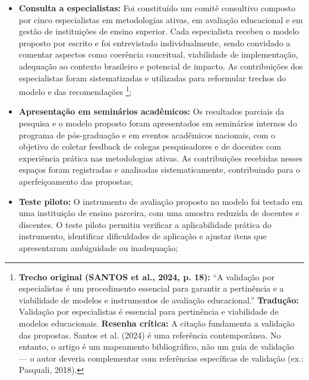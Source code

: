 \begin{itemize}
    \item \textbf{Consulta a especialistas:} Foi constituído um comitê consultivo composto por cinco especialistas em metodologias ativas, em avaliação educacional e em gestão de instituições de ensino superior. Cada especialista recebeu o modelo proposto por escrito e foi entrevistado individualmente, sendo convidado a comentar aspectos como coerência conceitual, viabilidade de implementação, adequação ao contexto brasileiro e potencial de impacto. As contribuições dos especialistas foram sistematizadas e utilizadas para reformular trechos do modelo e das recomendações \cite{SANTOS2024}\footnote{\textbf{Trecho original (SANTOS et al., 2024, p. 18):} ``A validação por especialistas é um procedimento essencial para garantir a pertinência e a viabilidade de modelos e instrumentos de avaliação educacional.'' \textbf{Tradução:} Validação por especialistas é essencial para pertinência e viabilidade de modelos educacionais. \textbf{Resenha crítica:} A citação fundamenta a validação das propostas. Santos et al. (2024) é uma referência contemporânea. No entanto, o artigo é um mapeamento bibliográfico, não um guia de validação — o autor deveria complementar com referências específicas de validação (ex.: Pasquali, 2018).};
    \item \textbf{Apresentação em seminários acadêmicos:} Os resultados parciais da pesquisa e o modelo proposto foram apresentados em seminários internos do programa de pós-graduação e em eventos acadêmicos nacionais, com o objetivo de coletar feedback de colegas pesquisadores e de docentes com experiência prática nas metodologias ativas. As contribuições recebidas nesses espaços foram registradas e analisadas sistematicamente, contribuindo para o aperfeiçoamento das propostas;
    \item \textbf{Teste piloto:} O instrumento de avaliação proposto no modelo foi testado em uma instituição de ensino parceira, com uma amostra reduzida de docentes e discentes. O teste piloto permitiu verificar a aplicabilidade prática do instrumento, identificar dificuldades de aplicação e ajustar itens que apresentaram ambiguidade ou inadequação;

\end{itemize}

